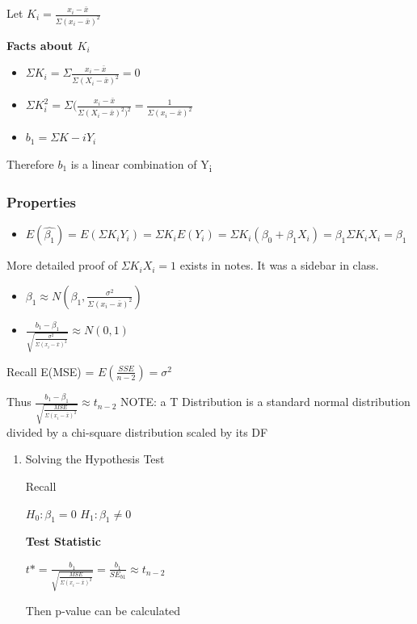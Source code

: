 \documentclass[11pt]{article}
\begin{document}
Let \(K_i = \frac{x_i - \bar{x}}{\Sigma(x_i - \bar{x})^2}\)

\textbf{Facts about \(K_i\)}
\begin{itemize}
\item \(\Sigma{K_i} = \Sigma \frac{x_i - \bar{x}}{\Sigma (X_i - \bar{x})^2} = 0\)
\item \(\Sigma K_i^2 = \Sigma (\frac{x_i - \bar{x}}{\Sigma (X_i - \bar{x})^2)^2} = \frac{1}{\Sigma{(x_i - \bar{x})^2}}\)

\item \(b_1 = \Sigma K-i Y_i\)
\end{itemize}

Therefore \(b_1\) is a linear combination of Y\textsubscript{i}
\subsubsection{Properties}
\label{sec:org5cf810e}
\begin{itemize}
\item \(E(\hat{\beta_1}) = E(\Sigma K_i Y_i) = \Sigma K_i E(Y_i) = \Sigma K_i
  (\beta_0 + \beta_1 X_i) = \beta_1 \Sigma K_i X_i = \beta_1\)
\end{itemize}

More detailed proof of \(\Sigma K_i X_i = 1\) exists in notes. It was a sidebar in
class.

\begin{itemize}
\item \(\beta_1 \approx N(\beta_1, \frac{\sigma^2}{\Sigma(x_i - \bar{x})^2})\)
\item \(\frac{b_1 - \beta_1}{\sqrt{\frac{\sigma^2}{\Sigma(x_i - \bar{x})^2}}} \approx
  N(0,1)\)
\end{itemize}

Recall E(MSE) = \(E(\frac{SSE}{n - 2}) = \sigma^2\)

Thus \(\frac{b_1 - \beta_1}{\sqrt{\frac{MSE}{\Sigma(x_i - \bar{x})^2}}} \approx
  t_{n-2}\)
NOTE: a T Distribution is a standard normal distribution divided by a chi-square
  distribution scaled by its DF

\begin{enumerate}
\item Solving the Hypothesis Test
\label{sec:org141d90c}

Recall

\(H_0: \beta_1 = 0\)
\(H_1: \beta_1 \neq 0\)


\textbf{Test Statistic}

\(t* = \frac{b_1}{\sqrt{\frac{MSE}{\Sigma(x_i - \bar{x})^2}}} =
\frac{b_1}{SE_{b1}} \approx t_{n - 2}\)

Then p-value can be calculated
\end{enumerate}
\end{document}
